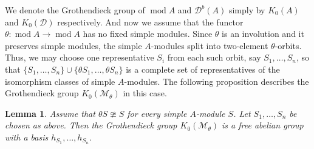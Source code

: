 \documentclass[12pt,reqno]{amsart}
\numberwithin{equation}{section}
\renewcommand{\mod}{\operatorname{mod}\nolimits}
\newcommand{\Hom}{\operatorname{Hom}\nolimits}
\newcommand{\go}{{K_0}}
\newtheorem{lemma}[theorem]{Lemma}
\begin{document}
	
	We denote the Grothendieck group of $\mod A$ and $\mathcal{D}^b(A)$ simply by $\go(A)$ and $\go(\mathcal{D})$ respectively.
	And now we assume that the functor $\theta:\mod A\rightarrow \mod A$ has no fixed simple modules. Since $\theta$ is an involution and it preserves simple modules, the
	simple $A$-modules split into two-element $\theta$-orbits. Thus, we may choose
	one representative $S_i$ from each such orbit, say $S_1,\dots,S_n$, so that
	$\{S_1,\dots,S_n\}\cup \{\theta S_1,\dots,\theta S_n\}$
	is a complete set of representatives of the isomorphism classes of simple
	$A$-modules. The following proposition describes the Grothendieck group $\go(\mathcal{M}_\theta)$ in this case.
	
	\begin{lemma}\label{lem:basis-go-M}
		Assume that $\theta S\ncong S$ for every simple $A$-module $S$. Let
		$S_1,\dots,S_n$ be chosen as above. Then the Grothendieck group
		$\go(\mathcal{M}_\theta)$ is a free abelian group with a basis
		$h_{S_1},\ldots,h_{S_n}.$
	\end{lemma}
	
\end{document}
